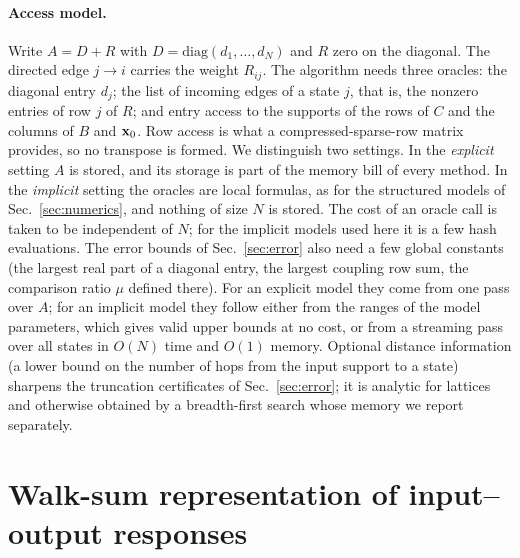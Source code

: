 \paragraph*{Access model.} Write $A=D+R$ with $D=\mathrm{diag}(d_1,\dots,d_N)$ and $R$ zero on the diagonal. The directed edge $j\to i$ carries the weight $R_{ij}$. The algorithm needs three oracles: the diagonal entry $d_j$; the list of incoming edges of a state $j$, that is, the nonzero entries of row $j$ of $R$; and entry access to the supports of the rows of $C$ and the columns of $B$ and ${\bf x}_0$. Row access is what a compressed-sparse-row matrix provides, so no transpose is formed. We distinguish two settings. In the \emph{explicit} setting $A$ is stored, and its storage is part of the memory bill of every method. In the \emph{implicit} setting the oracles are local formulas, as for the structured models of Sec.~\ref{sec:numerics}, and nothing of size $N$ is stored. The cost of an oracle call is taken to be independent of $N$; for the implicit models used here it is a few hash evaluations. The error bounds of Sec.~\ref{sec:error} also need a few global constants (the largest real part of a diagonal entry, the largest coupling row sum, the comparison ratio $\mu$ defined there). For an explicit model they come from one pass over $A$; for an implicit model they follow either from the ranges of the model parameters, which gives valid upper bounds at no cost, or from a streaming pass over all states in $O(N)$ time and $O(1)$ memory. Optional distance information (a lower bound on the number of hops from the input support to a state) sharpens the truncation certificates of Sec.~\ref{sec:error}; it is analytic for lattices and otherwise obtained by a breadth-first search whose memory we report separately.

\section{Walk-sum representation of input--output responses}\label{sec:representation}

